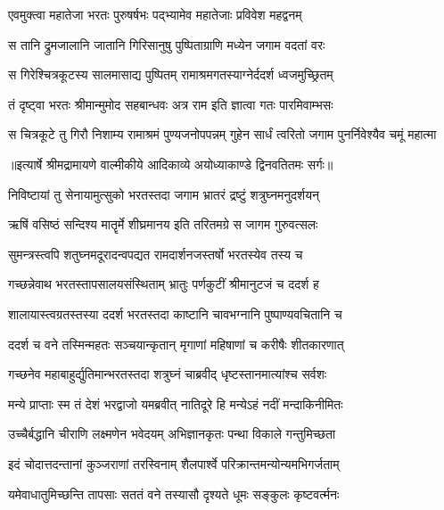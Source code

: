 \twolineshloka
{एवमुक्त्वा महातेजा भरतः पुरुषर्षभः}
{पद्भ्यामेव महातेजाः प्रविवेश महद्वनम्} %

\twolineshloka
{स तानि द्रुमजालानि जातानि गिरिसानुषु}
{पुष्पिताग्राणि मध्येन जगाम वदतां वरः} %

\twolineshloka
{स गिरेश्चित्रकूटस्य सालमासाद्य पुष्पितम्}
{रामाश्रमगतस्याग्नेर्ददर्श ध्वजमुच्छ्रितम्} %

\twolineshloka
{तं दृष्ट्वा भरतः श्रीमान्मुमोद सहबान्धवः}
{अत्र राम इति ज्ञात्वा गतः पारमिवाम्भसः} %

\fourlineindentedshloka
{स चित्रकूटे तु गिरौ निशाम्य}
{रामाश्रमं पुण्यजनोपपन्नम्}
{गुहेन सार्धं त्वरितो जगाम}
{पुनर्निवेश्यैव चमूं महात्मा} %


{॥इत्यार्षे श्रीमद्रामायणे वाल्मीकीये आदिकाव्ये अयोध्याकाण्डे द्विनवतितमः सर्गः॥}


\twolineshloka
{निविष्टायां तु सेनायामुत्सुको भरतस्तदा}
{जगाम भ्रातरं द्रष्टुं शत्रुघ्नमनुदर्शयन्} %

\twolineshloka
{ऋषिं वसिष्ठं सन्दिश्य मातॄर्मे शीघ्रमानय}
{इति तरितमग्रे स जागम गुरुवत्सलः} %

\twolineshloka
{सुमन्त्रस्त्वपि शतुघ्नमदूरादन्वपद्यत}
{रामदार्शनजस्तर्षो भरतस्येव तस्य च} %

\twolineshloka
{गच्छन्नेवाथ भरतस्तापसालयसंस्थिताम्}
{भ्रातुः पर्णकुटीं श्रीमानुटजं च ददर्श ह} %

\twolineshloka
{शालायास्त्वग्रतस्तस्या ददर्श भरतस्तदा}
{काष्टानि चावभग्नानि पुष्पाण्यवचितानि च} %

\twolineshloka
{ददर्श च वने तस्मिन्महतः सञ्चयान्कृतान्}
{मृगाणां महिषाणां च करीषैः शीतकारणात्} %

\twolineshloka
{गच्छनेव महाबाहुर्द्युतिमान्भरतस्तदा}
{शत्रुघ्नं चाब्रवीद् धृष्टस्तानमात्यांश्च सर्वशः} %

\twolineshloka
{मन्ये प्राप्ताः स्म तं देशं भरद्वाजो यमब्रवीत्}
{नातिदूरे हि मन्येऽहं नदीं मन्दाकिनीमितः} %

\twolineshloka
{उच्चैर्बद्धानि चीराणि लक्ष्मणेन भवेदयम्}
{अभिज्ञानकृतः पन्था विकाले गन्तुमिच्छता} %

\twolineshloka
{इदं चोदात्तदन्तानां कुञ्जराणां तरस्विनाम्}
{शैलपार्श्वे परिक्रान्तमन्योन्यमभिगर्जताम्} %

\twolineshloka
{यमेवाधातुमिच्छन्ति तापसाः सततं वने}
{तस्यासौ दृश्यते धूमः सङ्कुलः कृष्टवर्त्मनः} %

